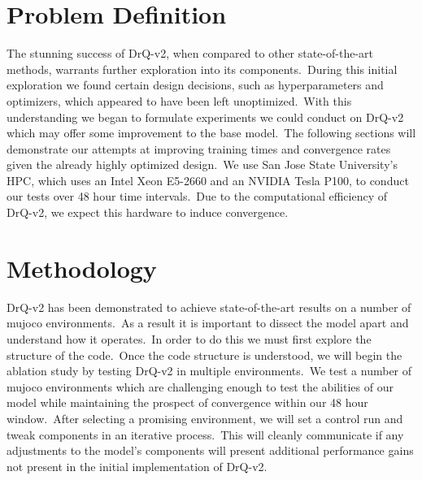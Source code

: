 \documentclass[conference]{./IEEEtran/IEEEtran} %
\begin{document}
    \section{Problem Definition}\label{sec:problem-definition}

    The stunning success of DrQ-v2, when compared to other state-of-the-art methods, warrants further exploration into its components.\
    During this initial exploration we found certain design decisions, such as hyperparameters and optimizers, which appeared to have
    been left unoptimized.\ With this understanding we began to formulate experiments we could conduct on DrQ-v2 which may offer some
    improvement to the base model.\ The following sections will demonstrate our attempts at improving training times and convergence
    rates given the already highly optimized design.\ We use San Jose State University’s HPC, which uses an Intel Xeon E5-2660 and an
    NVIDIA Tesla P100, to conduct our tests over 48 hour time intervals.\ Due to the computational efficiency of DrQ-v2, we expect this
    hardware to induce convergence.\

    \section{Methodology}\label{sec:methodology}

    DrQ-v2 has been demonstrated to achieve state-of-the-art results on a number of mujoco environments.\ As a result it is
    important to dissect the model apart and understand how it operates.\ In order to do this we must first explore the
    structure of the code.\ Once the code structure is understood, we will begin the ablation study by testing DrQ-v2 in
    multiple environments.\ We test a number of mujoco environments which are challenging enough to test the abilities of our
    model while maintaining the prospect of convergence within our 48 hour window.\ After selecting a promising environment,
    we will set a control run and tweak components in an iterative process.\ This will cleanly communicate if any adjustments
    to the model's components will present additional performance gains not present in the initial implementation of DrQ-v2.
\end{document}
